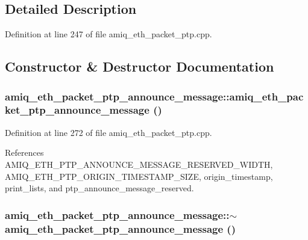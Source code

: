 \subsection{Detailed Description}


Definition at line 247 of file amiq\_\-eth\_\-packet\_\-ptp.cpp.

\subsection{Constructor \& Destructor Documentation}
\hypertarget{classamiq__eth__packet__ptp__announce__message_a50c67961ebff6d26140d5718004e922f}{
\subsubsection[{amiq\_\-eth\_\-packet\_\-ptp\_\-announce\_\-message}]{\setlength{\rightskip}{0pt plus 5cm}amiq\_\-eth\_\-packet\_\-ptp\_\-announce\_\-message::amiq\_\-eth\_\-packet\_\-ptp\_\-announce\_\-message ()}}
\label{classamiq__eth__packet__ptp__announce__message_a50c67961ebff6d26140d5718004e922f}


Definition at line 272 of file amiq\_\-eth\_\-packet\_\-ptp.cpp.

References AMIQ\_\-ETH\_\-PTP\_\-ANNOUNCE\_\-MESSAGE\_\-RESERVED\_\-WIDTH, AMIQ\_\-ETH\_\-PTP\_\-ORIGIN\_\-TIMESTAMP\_\-SIZE, origin\_\-timestamp, print\_\-lists, and ptp\_\-announce\_\-message\_\-reserved.\hypertarget{classamiq__eth__packet__ptp__announce__message_a2fb1709d53f4e22c9acaa0d78926fe82}{
\subsubsection[{$\sim$amiq\_\-eth\_\-packet\_\-ptp\_\-announce\_\-message}]{\setlength{\rightskip}{0pt plus 5cm}amiq\_\-eth\_\-packet\_\-ptp\_\-announce\_\-message::$\sim$amiq\_\-eth\_\-packet\_\-ptp\_\-announce\_\-message ()}}
\label{classamiq__eth__packet__ptp__announce__message_a2fb1709d53f4e22c9acaa0d78926fe82}


